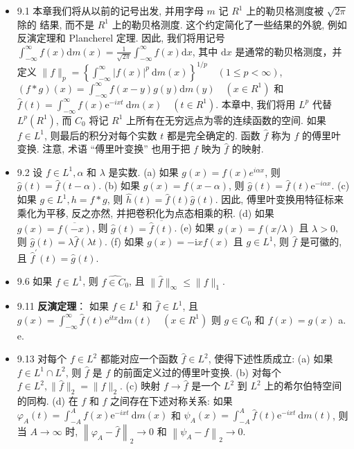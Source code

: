 \begin{itemize}
\item 9.1 本章我们将从以前的记号出发, 并用字母 $m$ 记 $R^{1}$ 上的勒贝格测度被 $\sqrt{2 \pi}$ 除的 结果, 而不是 $R^{1}$ 上的勒贝格测度. 这个约定简化了一些结果的外貌, 例如反演定理和 Plancherel 定理. 因此, 我们将用记号 $\int_{-\infty}^{\infty} f(x) \mathrm{d} m(x)=\frac{1}{\sqrt{2 \pi}} \int_{-\infty}^{\infty} f(x) \mathrm{d} x$, 其中 $\mathrm{d} x$ 是通常的勒贝格测度，并定义 $\|f\|_{p}=\left\{\int_{-\infty}^{\infty}|f(x)|^{p} \mathrm{~d} m(x)\right\}^{1 / p} \quad(1 \leqslant p<\infty)$, $(f * g)(x)=\int_{-\infty}^{\infty} f(x-y) g(y) \mathrm{d} m(y) \quad\left(x \in R^{1}\right)$ 和 $\hat{f}(t)=\int_{-\infty}^{\infty} f(x) \mathrm{e}^{-i xt} \mathrm{~d} m(x) \quad\left(t \in R^{1}\right)$. 本章中, 我们将用 $L^{p}$ 代替 $L^{p}\left(R^{1}\right)$, 而 $C_{0}$ 将记 $R^{1}$ 上所有在无穷远点为零的连续函数的空间. 如果 $f \in L^{1}$, 则最后的积分对每个实数 $t$ 都是完全确定的. 函数 $\hat{f}$ 称为 $f$ 的傅里叶变换. 注意, 术语 “傅里叶变换” 也用于把 $f$ 映为 $\hat{f}$ 的映射.

\item 9.2 设 $f \in L^{1}, \alpha$ 和 $\lambda$ 是实数. (a) 如果 $g(x)=f(x) e^{i \alpha x}$, 则 $\hat{g}(t)=\hat{f}(t-\alpha)$. (b) 如果 $g(x)=f(x-\alpha)$, 则 $\hat{g}(t)=\hat{f}(t) \mathrm{e}^{-i\alpha x}$. (c) 如果 $g \in L^{1}, h=f * g$, 则 $\hat{h}(t)=\hat{f}(t) \hat{g}(t)$. 因此, 傅里叶变换用特征标来乘化为平移, 反之亦然, 并把卷积化为点态相乘的积. (d) 如果 $g(x)=\overline{f(-x)}$, 则 $\hat{g}(t)=\overline{\hat{f}(t)}$. (e) 如果 $g(x)=f(x / \lambda)$ 且 $\lambda>0$, 则 $\hat{g}(t)=\lambda \hat{f}(\lambda t)$. (f) 如果 $g(x)=-\mathrm{i} x f(x)$ 且 $g \in L^{1}$, 则 $\hat{f}$ 是可徽的, 且 $\hat{f}^{\prime}(t)=\hat{g}(t)$.

\item 9.6 如果 $f \in L^{1}$, 则 $\hat{f \in C_{0}}$, 且 $\|\hat{f}\|_{\infty} \leqslant\|f\|_{1}$.

\item 9.11 \textbf{反演定理}： 如果 $f \in L^{1}$ 和 $\hat{f} \in L^{1}$, 且 $g(x)=\int_{-\infty}^{\infty} \hat{f}(t) \mathrm{e}^{itx} \mathrm{d} m(t) \quad\left(x \in R^{1}\right)$ 则 $g \in C_{0}$ 和 $f(x)=g(x)$ a. e.

\item 9.13 对每个 $f \in L^{2}$ 都能对应一个函数 $\hat{f} \in L^{2}$, 使得下述性质成立: (a) 如果 $f \in L^{1} \cap L^{2}$, 则 $\hat{f}$ 是 $f$ 的前面定义过的傅里叶变换. (b) 对每个 $f \in L^{2},\|\hat{f}\|_{2}=\|f\|_{2}$. (c) 映射 $f \rightarrow \hat{f}$ 是一个 $L^{2}$ 到 $L^{2}$ 上的希尔伯特空间的同构. (d) 在 $f$ 和 $\hat{f}$ 之间存在下述对称关系: 如果 $\varphi_{A}(t)=\int_{-A}^{A} f(x) \mathrm{e}^{-ixt} \mathrm{~d} m(x)$ 和 $\psi_{A}(x)=\int_{-A}^{A} \hat{f}(t) \mathrm{e}^{-ix t} \mathrm{~d} m(t)$, 则当 $A \rightarrow \infty$ 时, $\left\|\varphi_{A}-\hat{f}\right\|_{2} \rightarrow 0$ 和 $\left\|\psi_{A}-f\right\|_{2} \rightarrow 0$.


\end{itemize}
